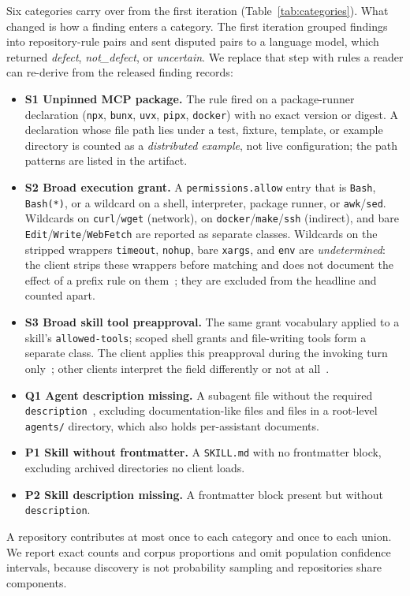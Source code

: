 \documentclass[10pt,conference]{IEEEtran}
\begin{document}
Six categories carry over from the first iteration (Table~\ref{tab:categories}). What changed is how a finding enters a category. The first iteration grouped findings into repository-rule pairs and sent disputed pairs to a language model, which returned \emph{defect}, \emph{not\_defect}, or \emph{uncertain}. We replace that step with rules a reader can re-derive from the released finding records:
\begin{itemize}
\item \textbf{S1 Unpinned MCP package.} The rule fired on a package-runner declaration (\texttt{npx}, \texttt{bunx}, \texttt{uvx}, \texttt{pipx}, \texttt{docker}) with no exact version or digest. A declaration whose file path lies under a test, fixture, template, or example directory is counted as a \emph{distributed example}, not live configuration; the path patterns are listed in the artifact.
\item \textbf{S2 Broad execution grant.} A \texttt{permissions.allow} entry that is \texttt{Bash}, \texttt{Bash(*)}, or a wildcard on a shell, interpreter, package runner, or \texttt{awk}/\texttt{sed}. Wildcards on \texttt{curl}/\texttt{wget} (network), on \texttt{docker}/\texttt{make}/\texttt{ssh} (indirect), and bare \texttt{Edit}/\texttt{Write}/\texttt{WebFetch} are reported as separate classes. Wildcards on the stripped wrappers \texttt{timeout}, \texttt{nohup}, bare \texttt{xargs}, and \texttt{env} are \emph{undetermined}: the client strips these wrappers before matching and does not document the effect of a prefix rule on them~\cite{claude_permissions}; they are excluded from the headline and counted apart.
\item \textbf{S3 Broad skill tool preapproval.} The same grant vocabulary applied to a skill's \texttt{allowed-tools}; scoped shell grants and file-writing tools form a separate class. The client applies this preapproval during the invoking turn only~\cite{claude_skills}; other clients interpret the field differently or not at all~\cite{agentskills_spec}.
\item \textbf{Q1 Agent description missing.} A subagent file without the required \texttt{description}~\cite{claude_subagents,github_agents}, excluding documentation-like files and files in a root-level \texttt{agents/} directory, which also holds per-assistant documents.
\item \textbf{P1 Skill without frontmatter.} A \texttt{SKILL.md} with no frontmatter block, excluding archived directories no client loads.
\item \textbf{P2 Skill description missing.} A frontmatter block present but without \texttt{description}.
\end{itemize}
A repository contributes at most once to each category and once to each union. We report exact counts and corpus proportions and omit population confidence intervals, because discovery is not probability sampling and repositories share components.
\end{document}
